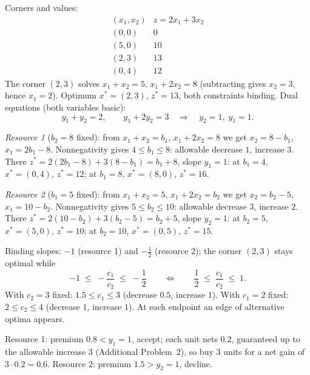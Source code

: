 \begin{solutions}
  \item Corners and values:
        \[
          \begin{array}{c|c}
            (x_{1},x_{2}) & z=2x_{1}+3x_{2}\\\hline
            (0,0) & 0\\
            (5,0) & 10\\
            (2,3) & 13\\
            (0,4) & 12
          \end{array}
        \]
        The corner $(2,3)$ solves $x_{1}+x_{2}=5$, $x_{1}+2x_{2}=8$
        (subtracting gives $x_{2}=3$, hence $x_{1}=2$). Optimum
        $x^{*}=(2,3)$, $z^{*}=13$, both constraints binding. Dual
        equations (both variables basic):
        \[
          y_{1}+y_{2}=2,\qquad y_{1}+2y_{2}=3
          \quad\Longrightarrow\quad y_{2}=1,\; y_{1}=1 .
        \]

  \item \emph{Resource 1} ($b_{2}=8$ fixed): from $x_{1}+x_{2}=b_{1}$,
        $x_{1}+2x_{2}=8$ we get $x_{2}=8-b_{1}$, $x_{1}=2b_{1}-8$.
        Nonnegativity gives $4\le b_{1}\le 8$: allowable decrease $1$,
        increase $3$. There $z^{*}=2(2b_{1}-8)+3(8-b_{1})=b_{1}+8$,
        slope $y_{1}=1$: at $b_{1}=4$, $x^{*}=(0,4)$, $z^{*}=12$; at
        $b_{1}=8$, $x^{*}=(8,0)$, $z^{*}=16$.

        \emph{Resource 2} ($b_{1}=5$ fixed): from $x_{1}+x_{2}=5$,
        $x_{1}+2x_{2}=b_{2}$ we get $x_{2}=b_{2}-5$, $x_{1}=10-b_{2}$.
        Nonnegativity gives $5\le b_{2}\le 10$: allowable decrease $3$,
        increase $2$. There $z^{*}=2(10-b_{2})+3(b_{2}-5)=b_{2}+5$,
        slope $y_{2}=1$: at $b_{2}=5$, $x^{*}=(5,0)$, $z^{*}=10$; at
        $b_{2}=10$, $x^{*}=(0,5)$, $z^{*}=15$.

  \item Binding slopes: $-1$ (resource 1) and $-\tfrac12$ (resource 2);
        the corner $(2,3)$ stays optimal while
        \[
          -1\;\le\;-\frac{c_{1}}{c_{2}}\;\le\;-\frac12
          \qquad\Longleftrightarrow\qquad
          \frac12\;\le\;\frac{c_{1}}{c_{2}}\;\le\;1 .
        \]
        With $c_{2}=3$ fixed: $1.5\le c_{1}\le 3$ (decrease $0.5$,
        increase $1$). With $c_{1}=2$ fixed: $2\le c_{2}\le 4$ (decrease
        $1$, increase $1$). At each endpoint an edge of alternative
        optima appears.

  \item Resource 1: premium $0.8<y_{1}=1$, accept; each unit nets
        $0.2$, guaranteed up to the allowable increase $3$ (Additional
        Problem~2), so buy $3$ units for a net gain of $3\cdot0.2=0.6$.
        Resource 2: premium $1.5>y_{2}=1$, decline.


\end{solutions}
